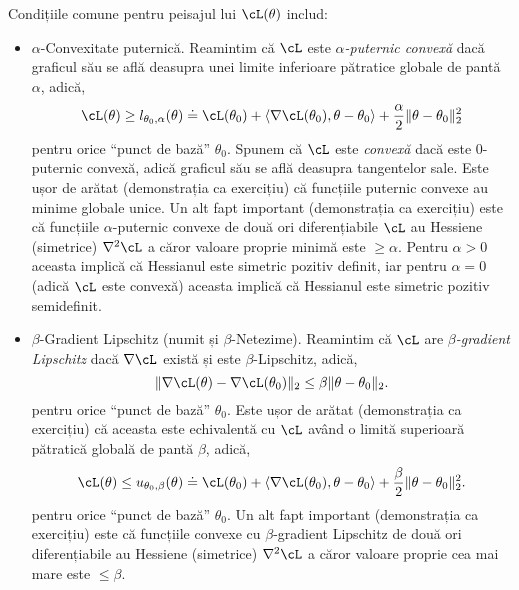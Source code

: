 \documentclass[../../book-main_ro.tex]{subfiles}
\begin{document}
Condițiile comune pentru peisajul lui \(\cL(\theta)\) includ:
\begin{itemize}
    \item \(\alpha\)-Convexitate puternică. Reamintim că \(\cL\) este \textit{\(\alpha\)-puternic convexă} dacă graficul său se află deasupra unei limite inferioare pătratice globale de pantă \(\alpha\), adică,
    \begin{equation}
        \cL(\theta) \geq l_{\theta_{0}, \alpha}(\theta) \doteq \cL(\theta_{0}) + \ip{\nabla \cL(\theta_{0})}{\theta - \theta_{0}} + \frac{\alpha}{2}\norm{\theta - \theta_{0}}_{2}^{2}
    \end{equation}
    pentru orice ``punct de bază'' \(\theta_{0}\). Spunem că \(\cL\) este \textit{convexă} dacă este \(0\)-puternic convexă, adică graficul său se află deasupra tangentelor sale. Este ușor de arătat (demonstrația ca exercițiu) că funcțiile puternic convexe au minime globale unice. Un alt fapt important (demonstrația ca exercițiu) este că funcțiile \(\alpha\)-puternic convexe de două ori diferențiabile \(\cL\) au Hessiene (simetrice) \(\nabla^{2}\cL\) a căror valoare proprie minimă este \(\geq \alpha\). Pentru \(\alpha > 0\) aceasta implică că Hessianul este simetric pozitiv definit, iar pentru \(\alpha = 0\) (adică \(\cL\) este convexă) aceasta implică că Hessianul este simetric pozitiv semidefinit.
    \item \(\beta\)-Gradient Lipschitz (numit și \(\beta\)-Netezime). Reamintim că \(\cL\) are \textit{\(\beta\)-gradient Lipschitz} dacă \(\nabla \cL\) există și este \(\beta\)-Lipschitz, adică,
    \begin{equation}
        \norm{\nabla \cL(\theta) - \nabla \cL(\theta_{0})}_{2} \leq \beta \norm{\theta - \theta_{0}}_{2}.
    \end{equation}
    pentru orice ``punct de bază'' \(\theta_{0}\). Este ușor de arătat (demonstrația ca exercițiu) că aceasta este echivalentă cu \(\cL\) având o limită superioară pătratică globală de pantă \(\beta\), adică,
    \begin{equation}
        \cL(\theta) \leq u_{\theta_{0}, \beta}(\theta) \doteq \cL(\theta_{0}) + \ip{\nabla \cL(\theta_{0})}{\theta - \theta_{0}} + \frac{\beta}{2}\norm{\theta - \theta_{0}}_{2}^{2}.
    \end{equation}
    pentru orice ``punct de bază'' \(\theta_{0}\). Un alt fapt important (demonstrația ca exercițiu) este că funcțiile convexe cu \(\beta\)-gradient Lipschitz de două ori diferențiabile au Hessiene (simetrice) \(\nabla^{2}\cL\) a căror valoare proprie cea mai mare este \(\leq \beta\).
\end{itemize}
\end{document}
